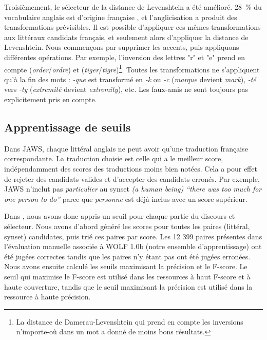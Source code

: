 Troisièmement, le sélecteur de la distance de Levenshtein a été amélioré. 28~\% du vocabulaire anglais est d'origine française \citep{finkenstaedt1973ordered}, et l'anglicisation a produit des transformations prévisibles. Il est possible d'appliquer ces mêmes transformations aux littéraux candidats français, et seulement alors d'appliquer la distance de Levenshtein. Nous commençons par supprimer les accents, puis appliquons différentes opérations. Par exemple, l'inversion des lettres "r" et "e" prend en compte (\textit{order}/\textit{ordre}) et (\textit{tiger}/\textit{tigre})\footnote{La distance de Damerau-Levenshtein qui prend en compte les inversions n'importe-où dans un mot \citep{damerau1964technique} a donné de moins bons résultats.}. Toutes les transformations ne s'appliquent qu'à la fin des mots : \textit{-que} est transformé en \textit{-k} ou \textit{-c} (\textit{marque} devient \textit{mark}), \textit{-té} vers \textit{-ty} (\textit{extremité} devient \textit{extremity}), etc. Les faux-amis ne sont toujours pas explicitement pris en compte.

\subsection{Apprentissage de seuils}
\label{subsec:learning_thresholds}

Dans JAWS, chaque littéral anglais ne peut avoir qu'une traduction française correspondante. La traduction choisie est celle qui a le meilleur score, indépendamment des scores des traductions moins bien notées. Cela a pour effet de rejeter des candidats valides et d'accepter des candidats erronés. Par exemple, JAWS n'inclut pas \textit{particulier} au synset \textit{(a human being) ``there was too much for one person to do''} parce que \textit{personne} est déjà inclus avec un score supérieur.

Dans \newjaws{}, nous avons donc appris un seuil pour chaque partie du discours et sélecteur. Nous avons d'abord généré les scores pour toutes les paires (littéral, synset) candidates, puis trié ces paires par score. Les 12 399 paires présentes dans l'évaluation manuelle associée à WOLF 1.0b (notre ensemble d'apprentissage) ont été jugées correctes tandis que les paires n'y étant pas ont été jugées erronées. Nous avons ensuite calculé les seuils maximisant la précision et le F-score. Le seuil qui maximise le F-score est utilisé dans les ressources à haut F-score et à haute couverture, tandis que le seuil maximisant la précision est utilisé dans la ressource à haute précision.

